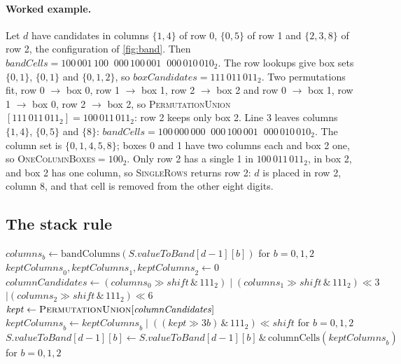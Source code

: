 \documentclass[11pt]{article}
\theoremstyle{definition}
\theoremstyle{plain}
\let\origtextsc\textsc
\renewcommand{\textsc}[1]{\textup{\origtextsc{#1}}}
\begin{document}
\paragraph{Worked example.} Let $d$ have candidates in columns $\{1,4\}$ of row 0, $\{0,5\}$ of row 1 and $\{2,3,8\}$
of row 2, the configuration of \cref{fig:band}. Then $\mathit{bandCells}=100\,001\,100\;\;000\,100\,001\;\;000\,010\,010_2$.
The row lookups give box sets $\{0,1\}$, $\{0,1\}$ and $\{0,1,2\}$, so
$\mathit{boxCandidates}=111\,011\,011_2$. Two permutations fit, row 0 $\to$ box 0, row 1 $\to$ box 1, row 2 $\to$ box 2
and row 0 $\to$ box 1, row 1 $\to$ box 0, row 2 $\to$ box 2, so
\textsc{PermutationUnion}$[111\,011\,011_2]=100\,011\,011_2$: row 2 keeps only box 2. Line 3 leaves columns $\{1,4\}$,
$\{0,5\}$ and $\{8\}$: $\mathit{bandCells}=100\,000\,000\;\;000\,100\,001\;\;000\,010\,010_2$. The column set is
$\{0,1,4,5,8\}$; boxes 0 and 1 have two columns each and box 2 one, so \textsc{OneColumnBoxes}$=100_2$. Only row 2 has
a single 1 in $100\,011\,011_2$, in box 2, and box 2 has one column, so \textsc{SingleRows} returns row 2: $d$ is placed
in row 2, column 8, and that cell is removed from the other eight digits.

\subsection{The stack rule}

\begin{algorithm}[H]
\caption{\textsc{StackRule}$(S, d)$}
\label{alg:stack}
\begin{algorithmic}[1]
\State $\mathit{columns}_b \gets \mathrm{bandColumns}(S.\mathit{valueToBand}[d-1][b])$ for $b = 0,1,2$ 
\State $\mathit{keptColumns}_0, \mathit{keptColumns}_1, \mathit{keptColumns}_2 \gets 0$
 
  \State $\mathit{columnCandidates} \gets (\mathit{columns}_0\gg \mathit{shift} \,\&\, 111_2) \mid (\mathit{columns}_1\gg \mathit{shift} \,\&\, 111_2)\ll 3$
  \Statex \hspace{\algorithmicindent}\hspace{\algorithmicindent}$\mid (\mathit{columns}_2\gg \mathit{shift} \,\&\, 111_2)\ll 6$ 
  \State $\mathit{kept} \gets \textsc{PermutationUnion}[\mathit{columnCandidates}]$
  \State $\mathit{keptColumns}_b \gets \mathit{keptColumns}_b \mid ((\mathit{kept} \gg 3b)\,\&\,111_2)\ll \mathit{shift}$ for $b = 0,1,2$
\EndFor
\State $S.\mathit{valueToBand}[d-1][b] \gets S.\mathit{valueToBand}[d-1][b] \,\&\, \mathrm{columnCells}(\mathit{keptColumns}_b)$ for $b = 0,1,2$
\end{algorithmic}
\end{algorithm}

\end{document}

